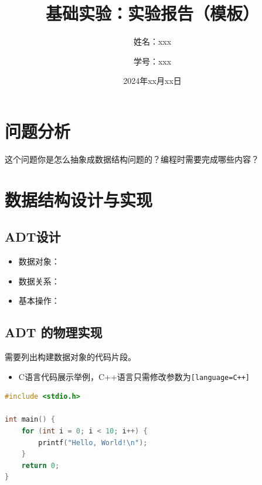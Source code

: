 \documentclass[12pt]{article}
\begin{document}
\renewcommand{\labelitemii}{$\circ$} %


\setlength{\droptitle}{-3cm}
\title{基础实验：实验报告（模板）}
\author{姓名：xxx \and 学号：xxx}
\date{2024年xx月xx日}
\maketitle


\section{问题分析}

这个问题你是怎么抽象成数据结构问题的？编程时需要完成哪些内容？


\section{数据结构设计与实现}

\subsection{ADT设计}

\begin{itemize}
    \item 数据对象：
    \item 数据关系：
    \item 基本操作：
\end{itemize}

\subsection{ADT 的物理实现}

需要列出构建数据对象的代码片段。

\begin{itemize}
    \item C语言代码展示举例，C++语言只需修改参数为\texttt{[language=C++]}
\end{itemize}
\begin{lstlisting}[language=C]
#include <stdio.h>

int main() {
    for (int i = 0; i < 10; i++) {
        printf("Hello, World!\n");
    }
    return 0;
}
\end{lstlisting}
\end{document}
